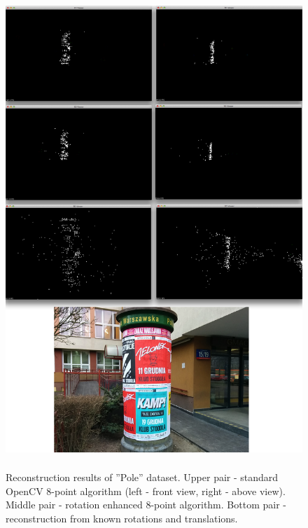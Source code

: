 \begin{figure}[p]
    \centering
    \includegraphics[height=18cm]{Pole4000Comparison}
    \caption[Reconstruction results of ''Pole'' dataset]{Reconstruction results of ''Pole'' dataset. Upper pair - standard OpenCV 8-point algorithm (left - front view, right - above view). Middle pair - rotation enhanced 8-point algorithm. Bottom pair - reconstruction from known rotations and translations.}
\end{figure}

